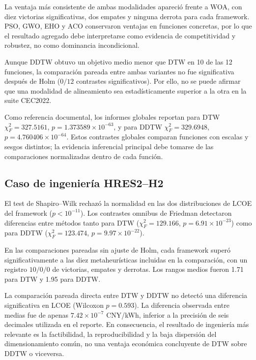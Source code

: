 La ventaja m\'as consistente de ambas modalidades apareci\'o frente a WOA, con
diez victorias significativas, dos empates y ninguna derrota para cada framework.
PSO, GWO, EHO y ACO conservaron ventajas en funciones concretas, por lo que el
resultado agregado debe interpretarse como evidencia de competitividad y
robustez, no como dominancia incondicional.

Aunque DDTW obtuvo un objetivo medio menor que DTW en 10 de las 12 funciones,
la comparaci\'on pareada entre ambas variantes no fue significativa despu\'es de
Holm ($0/12$ contrastes significativos). Por ello, no se puede afirmar que una
modalidad de alineamiento sea estad\'isticamente superior a la otra en la suite
CEC2022.

Como referencia documental, los informes globales reportan para DTW
$\chi_F^2=327.5161$, $p=1.373589\times10^{-63}$, y para DDTW
$\chi_F^2=329.6948$, $p=4.760406\times10^{-64}$. Estos contrastes globales
comparan funciones con escalas y sesgos distintos; la evidencia inferencial
principal debe tomarse de las comparaciones normalizadas dentro de cada funci\'on.

\subsection{Caso de ingenier\'ia HRES2--H2}
\label{sec:estadistico-hres2-es}

El test de Shapiro--Wilk rechaz\'o la normalidad en las dos distribuciones de
LCOE del framework ($p<10^{-11}$). Los contrastes omnibus de Friedman detectaron
diferencias entre m\'etodos tanto para DTW ($\chi_F^2=129.166$,
$p=6.91\times10^{-23}$) como para DDTW ($\chi_F^2=123.474$,
$p=9.97\times10^{-22}$).

En las comparaciones pareadas sin ajuste de Holm, cada framework super\'o significativamente a las diez metaheur\'isticas incluidas en la comparaci\'on, con un registro $10/0/0$ de victorias, empates y derrotas. Los rangos medios fueron 1.71 para DTW y 1.95 para DDTW.

La comparaci\'on pareada directa entre DTW y DDTW no detect\'o una diferencia
significativa en LCOE (Wilcoxon $p=0.593$). La diferencia observada entre medias
fue de apenas $7.42\times10^{-7}$ CNY/kWh, inferior a la precisi\'on de seis
decimales utilizada en el reporte. En consecuencia, el resultado de ingenier\'ia
m\'as relevante es la factibilidad, la reproducibilidad y la baja dispersi\'on
del dimensionamiento com\'un, no una ventaja econ\'omica concluyente de DTW sobre
DDTW o viceversa.


